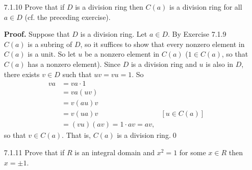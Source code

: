 \begin{enumerate}
      Since $C(a) \le R$ and is closed under multiplication, it follows by 
      definition that $C(a)$ is a subring of $R$. \\

      Now we want to show that $Z_R = \bigcap_{r \in R}C(r)$.

      ($\subseteq$) Let $s \in Z_R$ (the center is nonempty because it contains 
      1) and $b \in R$. Then it follows by definition that $sb = bs$, so that
      $s \in C(b)$. That is, $r \in C(b)$ for every $b \in R$, so that
      $s \in \bigcap_{r \in R}C(r)$. Thus $Z_R \subseteq \bigcap_{r \in R}C(r)$.

      ($\supseteq$) Let $s \in \bigcap_{r \in R}C(r)$ and $t \in R$. Since
      $s \in \bigcap_{r \in R}C(r)$, it follows particularly that $s \in C(t)$,
      so that $st = ts$; i.e., $s$ commutes with every member of $R$ and we have
      that $s \in Z_R$, so that $Z_R \supseteq \bigcap_{r \in R}C(r)$.

      Conclude that $Z_R = \bigcap_{r \in R}C(r)$. \qed
   \item[7.1.10]  Prove that if $D$ is a division ring then $C(a)$ is a division
                  ring for all $a \in D$ (cf. the preceding exercise).

      \textbf{Proof.} Suppose that $D$ is a division ring. Let $a \in D$. By
      Exercise 7.1.9 $C(a)$ is a subring of $D$, so it suffices to show that
      every nonzero element in $C(a)$ is a unit. So let $u$ be a nonzero element 
      in $C(a)$ ($1 \in C(a)$, so that $C(a)$ has a nonzero element). Since $D$ 
      is a division ring and $u$ is also in $D$, there exists $v \in D$ such 
      that $uv = vu = 1$. So
      \begin{align*}
         va &= va \cdot 1 \\
            &= va(uv) \\
            &= v(au)v \\
            &= v(ua)v &[u \in C(a)] \\
            &= (vu)(av) = 1 \cdot av = av,
      \end{align*}
      so that $v \in C(a)$. That is, $C(a)$ is a division ring.\qed
   \item[7.1.11]  Prove that if $R$ is an integral domain and $x^2 = 1$ for some
                  $x \in R$ then $x = \pm1$.


\end{enumerate}
